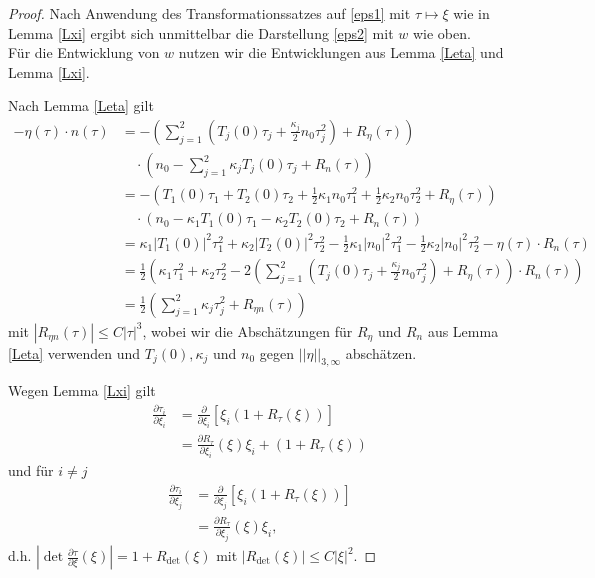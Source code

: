 \documentclass[12pt,a4paper]{scrartcl}
\numberwithin{equation}{section}
\begin{document}
\begin{proof}
Nach Anwendung des Transformationssatzes auf \eqref{eps1} mit $\tau \mapsto \xi$ wie in Lemma \ref{Lxi} ergibt sich unmittelbar die Darstellung \eqref{eps2} mit $w$ wie oben. \\
Für die Entwicklung von $w$ nutzen wir die Entwicklungen aus Lemma \ref{Leta} und Lemma \ref{Lxi}.

Nach Lemma \ref{Leta} gilt
\begin{align*}
- \eta(\tau) \cdot n(\tau) &= - \left(\sum_{j=1}^2\left(T_j(0) \tau_j + \frac{\kappa_j}{2} n_0 \tau_j^2 \right) + R_{\eta}(\tau)\right) \\
&\quad \cdot \left( n_0 - \sum_{j=1}^2 \kappa_j T_j (0) \tau_j +R_n(\tau) \right) \\
&=-(T_1 (0) \tau_1 +T_2(0) \tau_2 + \frac{1}{2} \kappa_1 n_0 \tau_1^2+ \frac{1}{2} \kappa_2 n_0 \tau_2^2 +  R_\eta(\tau))\\ 
&\quad\cdot ( n_0 - \kappa_1 T_1(0) \tau_1 - \kappa_2 T_2(0) \tau_2 + R_n (\tau)) \\
&= \kappa_1 |T_1(0)|^2 \tau_1^2 + \kappa_2 |T_2(0)|^2 \tau_2^2 -\frac{1}{2}\kappa_1 |n_0|^2 \tau_1^2  -\frac{1}{2}\kappa_2 |n_0|^2 \tau_2^2 - \eta(\tau) \cdot R_n(\tau) \\
&=\frac{1}{2}(\kappa_1 \tau_1^2 + \kappa_2 \tau_2^2 - 2\left( \sum_{j=1}^2\left(T_j(0) \tau_j + \frac{\kappa_j}{2} n_0 \tau_j^2 \right) + R_{\eta}(\tau)  \right) \cdot R_n(\tau)) \\
&= \frac{1}{2} \left(\sum_{j=1}^2 \kappa_j \tau_j^2 +R_{\eta n}(\tau) \right)
\end{align*}
mit $|R_{\eta n}(\tau)| \leq C |\tau|^3$, wobei wir die Abschätzungen für $R_\eta$ und $R_n$ aus Lemma \ref{Leta} verwenden und $T_j(0), \kappa_j$ und $n_0$ gegen $||\eta||_{3,\infty}$ abschätzen.
 
 
 
Wegen Lemma \ref{Lxi} gilt
\begin{align*}
\frac{\partial\tau_i}{\partial\xi_i} &=\frac{\partial}{\partial \xi_i}\left[\xi_i(1+R_\tau(\xi))\right] \\
  &=\frac{\partial R_\tau}{\partial \xi_i} (\xi)\xi_i + (1+R_\tau(\xi))
\end{align*}
und für $i \neq j$ 
\begin{align*}
\frac{\partial\tau_i}{\partial\xi_j} &=\frac{\partial}{\partial \xi_j}\left[\xi_i(1+R_\tau(\xi)) \right] \\
&=\frac{\partial R_\tau}{\partial \xi_j} (\xi)\xi_i,
\end{align*}
d.h. $|\det \frac{\partial \tau}{\partial \xi}(\xi)|= 1+ R_{\det}(\xi)$ mit $|R_{\det}(\xi)|\leq C |\xi|^2$. 





\end{proof}
\end{document}

